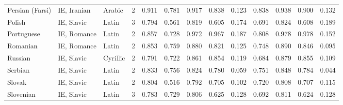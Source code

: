 \begin{tabular}{lllrrrrrrrrrr}
                Persian (Farsi) &                     IE, Iranian &     Arabic &         2 &                       0.911 &                         0.781 &         0.917 &                  0.838 &            0.123 &                         0.838 &         0.938 &                  0.900 &            0.132 \\
                         Polish &                      IE, Slavic &      Latin &         3 &                       0.794 &                         0.561 &         0.819 &                  0.605 &            0.174 &                         0.691 &         0.824 &                  0.608 &            0.189 \\
                     Portuguese &                     IE, Romance &      Latin &         2 &                       0.857 &                         0.728 &         0.972 &                  0.967 &            0.187 &                         0.808 &         0.978 &                  0.978 &            0.152 \\
                       Romanian &                     IE, Romance &      Latin &         2 &                       0.853 &                         0.759 &         0.880 &                  0.821 &            0.125 &                         0.748 &         0.890 &                  0.846 &            0.095 \\
                        Russian &                      IE, Slavic &   Cyrillic &         2 &                       0.791 &                         0.722 &         0.861 &                  0.854 &            0.119 &                         0.684 &         0.879 &                  0.855 &            0.109 \\
                        Serbian &                      IE, Slavic &      Latin &         2 &                       0.833 &                         0.756 &         0.824 &                  0.780 &            0.059 &                         0.751 &         0.848 &                  0.784 &            0.044 \\
                         Slovak &                      IE, Slavic &      Latin &         2 &                       0.804 &                         0.516 &         0.792 &                  0.705 &            0.102 &                         0.720 &         0.808 &                  0.707 &            0.115 \\
                      Slovenian &                      IE, Slavic &      Latin &         3 &                       0.783 &                         0.729 &         0.806 &                  0.625 &            0.128 &                         0.692 &         0.811 &                  0.624 &            0.128 \\

\end{tabular}
